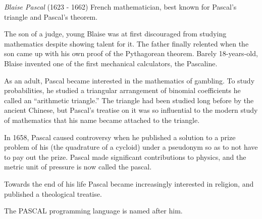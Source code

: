 \documentclass[12pt]{article}
\begin{document}
\emph{Blaise Pascal} (1623 - 1662) French mathematician, best known for Pascal's triangle and Pascal's theorem.

The son of a judge, young Blaise was at first discouraged from studying mathematics despite showing talent for it. The father finally relented when the son came up with his own proof of the Pythagorean theorem. Barely 18-years-old, Blaise invented one of the first mechanical calculators, the Pascaline.

As an adult, Pascal became interested in the mathematics of gambling. To study probabilities, he studied a triangular arrangement of binomial coefficients he called an ``arithmetic triangle.'' The triangle had been studied long before by the ancient Chinese, but Pascal's treatise on it was so influential to the modern study of mathematics that his name became attached to the triangle.

In 1658, Pascal caused controversy when he published a solution to a prize problem of his (the quadrature of a cycloid) under a pseudonym so as to not have to pay out the prize. Pascal made significant contributions to physics, and the metric unit of pressure is now called the pascal.

Towards the end of his life Pascal became increasingly interested in religion, and published a theological treatise.

The PASCAL programming language is named after him.
\end{document}
